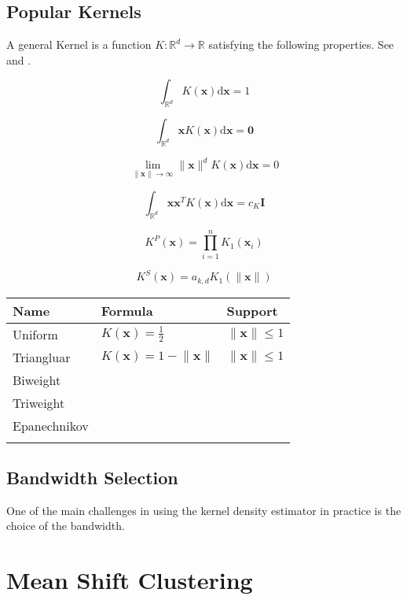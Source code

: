 \documentclass{article}
\begin{document}
\subsection{Popular Kernels}



A general Kernel is a function $K : \mathbb{R}^d \rightarrow \mathbb{R}$ satisfying the following properties. See \citep{Comaniciu.2002} and \citep[p.~95]{Wand.1995}.

\[
\int_{\mathbb{R}^d} K(\bm{x})\mathrm{d}\bm{x} = 1
\]

\[
\int_{\mathbb{R}^d} \bm{x} K(\bm{x})\mathrm{d}\bm{x} = \bm{0}
\]

\[
\lim_{\lVert \bm{x} \rVert \rightarrow \infty}  \lVert \bm{x} \rVert^d K(\bm{x})\mathrm{d}\bm{x} = 0
\]

\[
\int_{\mathbb{R}^d} \bm{x} \bm{x}^T K(\bm{x})\mathrm{d}\bm{x} = c_K \bm{I}
\]

\[
K^P(\bm{x}) = \prod_{i=1}^n K_1(\bm{x}_i)
\]

\[
K^S(\bm{x}) = a_{k,d} K_1(\lVert \bm{x} \rVert)
\]

\begin{table}[]
	\begin{tabular}{lll}
		\hline
		Name & Formula & Support \\ \hline
		Uniform & $K(\bm{x}) = \frac{1}{2}$ & $\lVert \bm{x} \rVert \leq 1$ \\
		Triangluar & $K(\bm{x}) = 1 - \lVert \bm{x} \rVert$ & $\lVert \bm{x} \rVert \leq 1$ \\
		Biweight &  &  \\
		Triweight &  &  \\
		Epanechnikov &  &  \\
		&  & 
	\end{tabular}
\end{table}

\subsection{Bandwidth Selection}

One of the main challenges in using the kernel density estimator in practice is the choice of the bandwidth.


\section{Mean Shift Clustering}
\end{document}
